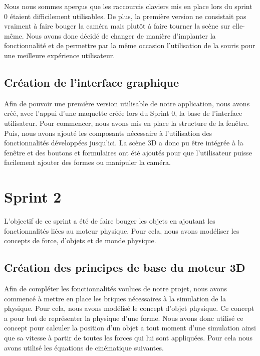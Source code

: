 \documentclass[11pt]{report}
\begin{document}
Nous nous sommes aperçus que les raccourcis claviers mis en place lors du sprint 0 étaient difficilement utilisables.
De plus, la première version ne consistait pas vraiment à faire bouger la caméra mais plutôt à faire tourner la scène
sur elle-même. Nous avons donc décidé de changer de manière d'implanter la fonctionnalité et de permettre par la même
occasion l'utilisation de la souris pour une meilleure expérience utilisateur.


\subsection{Création de l'interface graphique}

Afin de pouvoir une première version utilisable de notre application, nous avons créé, avec l'appui d'une maquette
créée lors du Sprint 0, la base de l'interface utilisateur. Pour commencer, nous avons mis en place la structure de la
fenêtre. Puis, nous avons ajouté les composants nécessaire à l'utilisation des fonctionnalités développées jusqu'ici.
La scène 3D a donc pu être intégrée à la fenêtre et des boutons et formulaires ont été ajoutés pour que l'utilisateur
puisse facilement ajouter des formes ou manipuler la caméra.


\section{Sprint 2}

L'objectif de ce sprint a été de faire bouger les objets en ajoutant les fonctionnalités liées au moteur physique. Pour cela,
nous avons modéliser les concepts de force, d'objets et de monde physique.

\subsection{Création des principes de base du moteur 3D}

Afin de compléter les fonctionnalités voulues de notre projet, nous avons commencé à mettre en place les briques
nécessaires à la simulation de la physique. Pour cela, nous avons modélisé le concept d'objet physique. Ce concept
a pour but de représenter la physique d'une forme. Nous avons donc utilisé ce concept pour calculer la position
d'un objet a tout moment d'une simulation ainsi que sa vitesse à partir de toutes les forces qui lui sont appliquées.
Pour cela nous avons utilisé les équations de cinématique suivantes.
\end{document}
